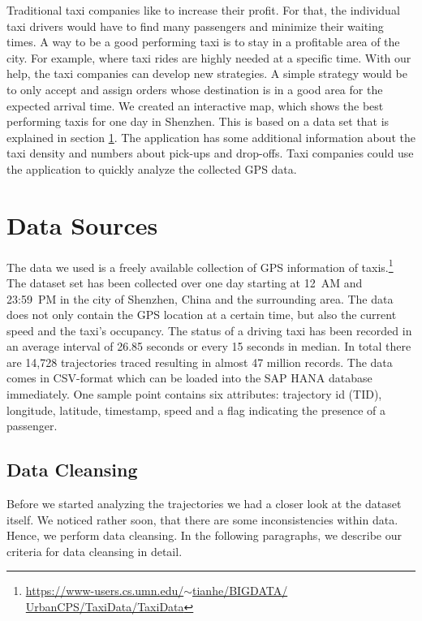 \documentclass[10pt]{sig-alternate}
\begin{document}
Traditional taxi companies like to increase their profit. For that, the individual taxi drivers would have to find many passengers and minimize their waiting times. A way to be a  good performing taxi is to stay in a profitable area of the city. For example, where taxi rides are highly needed at a specific time. With our help, the taxi companies can develop new strategies. A simple strategy would be to only accept and assign orders whose destination is in a good area for the expected arrival time. We created an interactive map, which shows the best performing taxis for one day in Shenzhen. This is based on a data set that is explained in section \ref{sec:ds}. The application has some additional information about the taxi density and numbers about pick-ups and drop-offs. Taxi companies could use the application to quickly analyze the collected GPS data.\\

\section{Data Sources}
\label{sec:ds}

The data we used is a freely available collection of GPS information of taxis.\footnote{\href{https://www-users.cs.umn.edu/~tianhe/BIGDATA/UrbanCPS/TaxiData/TaxiData}{https://www-users.cs.umn.edu/$\sim$tianhe/BIGDATA/\\UrbanCPS/TaxiData/TaxiData}} The dataset set has been collected over one day starting at 12~AM and 23:59~PM in the city of Shenzhen, China and the surrounding area. The data does not only contain the GPS location at a certain time, but also the current speed and the taxi's occupancy. The status of a driving taxi has been recorded in an average interval of 26.85 seconds or every 15 seconds in median. In total there are 14,728 trajectories traced resulting in almost 47 million records. The data comes in CSV-format which can be loaded into the SAP HANA database immediately. One sample point contains six attributes: trajectory id (TID), longitude, latitude, timestamp, speed and a flag indicating the presence of a passenger.

\subsection{Data Cleansing}
Before we started analyzing the trajectories we had a closer look at the dataset itself. We noticed rather soon, that there are some inconsistencies within data. Hence, we perform data cleansing. In the following paragraphs, we describe our criteria for data cleansing in detail.
\end{document}
